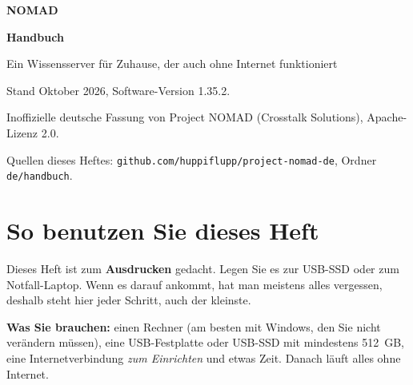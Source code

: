 \begin{titlepage}
\centering
\vspace*{2.5cm}
{\sffamily\bfseries\fontsize{40}{46}\selectfont\color{nomadbraun} NOMAD\par}
\vspace{0.4cm}
{\sffamily\bfseries\fontsize{24}{28}\selectfont Handbuch\par}
\vspace{0.8cm}
{\Large Ein Wissensserver für Zuhause, der auch ohne Internet funktioniert\par}
\vspace{2.5cm}
\vfill
{\small Stand Oktober 2026, Software-Version 1.35.2.\par
Inoffizielle deutsche Fassung von Project NOMAD (Crosstalk Solutions), Apache-Lizenz 2.0.\par
Quellen dieses Heftes: \texttt{github.com/huppiflupp/project-nomad-de}, Ordner \texttt{de/handbuch}.\par}
\end{titlepage}

\chapter*{So benutzen Sie dieses Heft}
Dieses Heft ist zum \textbf{Ausdrucken} gedacht. Legen Sie es zur USB-SSD oder zum Notfall-Laptop. Wenn es darauf ankommt, hat man meistens alles vergessen, deshalb steht hier jeder Schritt, auch der kleinste.

\textbf{Was Sie brauchen:} einen Rechner (am besten mit Windows, den Sie nicht verändern müssen), eine USB-Festplatte oder USB-SSD mit mindestens 512~GB, eine Internetverbindung \emph{zum Einrichten} und etwas Zeit. Danach läuft alles ohne Internet.

